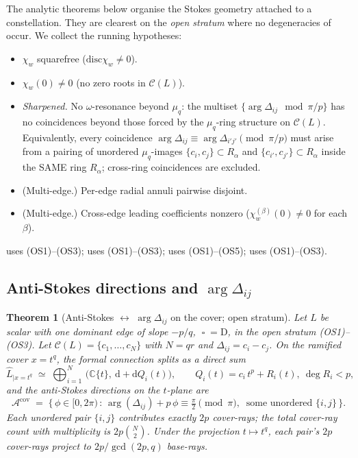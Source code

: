\documentclass[11pt,a4paper]{article}
\theoremstyle{plain}
\newtheorem{theorem}{Theorem}[section]
\theoremstyle{definition}
\theoremstyle{remark}
\newcommand{\op}{\mathop{\square}}                %
\newcommand{\opD}{\mathrm{D}}                     %
\newcommand{\Cl}{\mathcal{C}}
\newcommand{\disc}{\mathrm{disc}}
\newcommand{\Acov}{\mathcal{A}^{\mathrm{cov}}}
\newcommand{\Dij}{\Delta_{ij}}
\DeclareMathOperator{\arginline}{arg}
\begin{document}
The analytic theorems below organise the Stokes geometry attached to a
constellation. They are clearest on the \emph{open stratum} where no
degeneracies of  occur. We collect the running
hypotheses:
\begin{itemize}[leftmargin=2.5em]
\item[(OS1)] $\chi_w$ squarefree ($\disc \chi_w \ne 0$).
\item[(OS2)] $\chi_w(0) \ne 0$ (no zero roots in $\Cl(L)$).
\item[(OS3)] \emph{Sharpened.} No $\omega$-resonance beyond
       $\mu_q$: the multiset $\{\arginline \Dij \mod \pi/p\}$ has no
       coincidences beyond those forced by the $\mu_q$-ring structure
       on $\Cl(L)$. Equivalently, every coincidence
       $\arginline \Dij \equiv \arginline \Delta_{i'j'} \pmod{\pi/p}$
       must arise from a pairing of unordered $\mu_q$-images
       $\{c_i, c_j\} \subset R_\alpha$ and
       $\{c_{i'}, c_{j'}\} \subset R_\alpha$ inside the SAME ring
       $R_\alpha$; cross-ring coincidences are excluded.
\item[(OS4)] (Multi-edge.) Per-edge radial annuli pairwise disjoint.
\item[(OS5)] (Multi-edge.) Cross-edge leading coefficients nonzero
       ($\chi_w^{(\beta)}(0) \ne 0$ for each $\beta$).
\end{itemize}
 uses (OS1)--(OS3);  uses (OS1)--(OS3);
 uses (OS1)--(OS5);  uses (OS1)--(OS3).

\subsection{\texorpdfstring{Anti-Stokes directions and $\arg \Delta_{ij}$}{Anti-Stokes directions and arg Delta\_ij}}\label{ssec:AT1}

\begin{theorem}[Anti-Stokes $\leftrightarrow$ $\arginline \Dij$ on the
cover; open stratum]\label{thm:AT1}
Let $L$ be scalar with one dominant edge of slope $-p/q$, $\op = \opD$, in
the open stratum (OS1)--(OS3). Let $\Cl(L) = \{c_1, \dots, c_N\}$ with
$N = qr$ and $\Dij = c_i - c_j$. On the ramified cover $x = t^q$, the
formal connection splits as a direct sum
\[
   \widehat{L}_{|x = t^q}
   \;\simeq\;
   \bigoplus_{i = 1}^{N}\,
   \big(\mathbb{C}\{t\},\ \mathrm{d} + \mathrm{d} Q_i(t)\big),
   \qquad Q_i(t) = c_i\, t^p + R_i(t),\ \deg R_i < p,
\]
and the anti-Stokes directions on the $t$-plane are
\[
   \Acov
   \;=\;
   \big\{\, \phi \in [0, 2\pi)\, :\,
   \arginline(\Dij) + p\, \phi \equiv \tfrac{\pi}{2} \pmod{\pi},\
   \text{ some unordered } \{i, j\} \,\big\}.
\]
Each unordered pair $\{i, j\}$ contributes exactly $2p$ cover-rays; the
total cover-ray count with multiplicity is $2 p \binom{N}{2}$. Under the
projection $t \mapsto t^q$, each pair's $2p$ cover-rays project to
$2p / \gcd(2p, q)$ base-rays.
\end{theorem}
\end{document}
